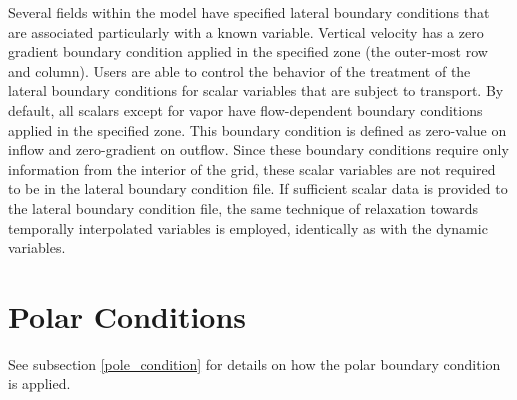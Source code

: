 Several fields within the model have specified lateral boundary conditions that are 
associated particularly with a known variable.
Vertical velocity has a zero gradient boundary condition applied in the
specified zone (the outer-most row and column).
Users are able to control the behavior of the treatment of the lateral boundary conditions
for scalar variables that are subject to transport. 
By default, all scalars except for vapor have flow-dependent boundary
conditions applied in the specified zone. This boundary condition is defined as zero-value on inflow
and zero-gradient on outflow. Since these boundary conditions require only information from
the interior of the grid, these scalar variables are not required to be in the lateral boundary condition file.
If sufficient scalar data is provided to the lateral boundary condition file, the same technique of
relaxation
towards temporally interpolated variables is employed, identically as with the
dynamic variables.

\section{Polar Conditions}
See subsection \ref{pole_condition} for details on how the polar boundary
condition is applied.
